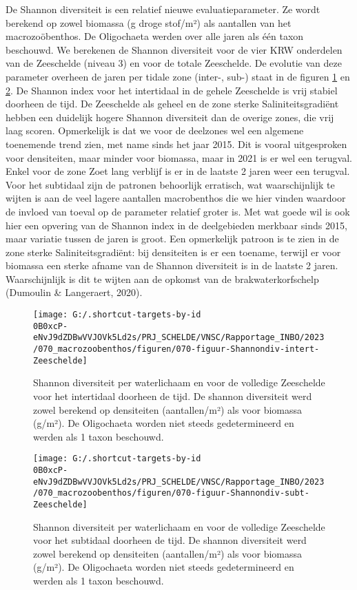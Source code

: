 \documentclass[twoside]{extreport}
\begin{document}
De Shannon diversiteit is een relatief nieuwe evaluatieparameter. Ze
wordt berekend op zowel biomassa (g droge stof/m²) als aantallen van het
macrozoöbenthos. De Oligochaeta werden over alle jaren als één taxon
beschouwd. We berekenen de Shannon diversiteit voor de vier KRW
onderdelen van de Zeeschelde (niveau 3) en voor de totale Zeeschelde. De
evolutie van deze parameter overheen de jaren per tidale zone (inter-,
sub-) staat in de figuren \ref{fig:070-figuur16} en
\ref{fig:070-figuur17}. De Shannon index voor het intertidaal in de
gehele Zeeschelde is vrij stabiel doorheen de tijd. De Zeeschelde als
geheel en de zone sterke Saliniteitsgradiënt hebben een duidelijk hogere
Shannon diversiteit dan de overige zones, die vrij laag scoren.
Opmerkelijk is dat we voor de deelzones wel een algemene toenemende
trend zien, met name sinds het jaar 2015. Dit is vooral uitgesproken
voor densiteiten, maar minder voor biomassa, maar in 2021 is er wel een
terugval. Enkel voor de zone Zoet lang verblijf is er in de laatste 2
jaren weer een terugval. Voor het subtidaal zijn de patronen behoorlijk
erratisch, wat waarschijnlijk te wijten is aan de veel lagere aantallen
macrobenthos die we hier vinden waardoor de invloed van toeval op de
parameter relatief groter is. Met wat goede wil is ook hier een opvering
van de Shannon index in de deelgebieden merkbaar sinds 2015, maar
variatie tussen de jaren is groot. Een opmerkelijk patroon is te zien in
de zone sterke Saliniteitsgradiënt: bij densiteiten is er een toename,
terwijl er voor biomassa een sterke afname van de Shannon diversiteit is
in de laatste 2 jaren. Waarschijnlijk is dit te wijten aan de opkomst
van de brakwaterkorfschelp (Dumoulin \& Langeraert, 2020).

\begin{figure}[H]

{\centering \texttt{[image: G:/.shortcut-targets-by-id\\0B0xcP-eNvJ9dZDBwVVJOVk5Ld2s/PRJ\_SCHELDE/VNSC/Rapportage\_INBO/2023/070\_macrozoobenthos/figuren/070-figuur-Shannondiv-intert-Zeeschelde]} 

}

\caption{Shannon diversiteit per waterlichaam en voor de volledige Zeeschelde voor het intertidaal doorheen de tijd. De shannon diversiteit werd zowel berekend op densiteiten (aantallen/m²) als voor biomassa (g/m²). De Oligochaeta worden niet steeds gedetermineerd en werden als 1 taxon beschouwd.}\label{fig:070-figuur16}
\end{figure}

\begin{figure}[H]

{\centering \texttt{[image: G:/.shortcut-targets-by-id\\0B0xcP-eNvJ9dZDBwVVJOVk5Ld2s/PRJ\_SCHELDE/VNSC/Rapportage\_INBO/2023/070\_macrozoobenthos/figuren/070-figuur-Shannondiv-subt-Zeeschelde]} 

}

\caption{Shannon diversiteit per waterlichaam en voor de volledige Zeeschelde voor het subtidaal doorheen de tijd. De shannon diversiteit werd zowel berekend op densiteiten (aantallen/m²) als voor biomassa (g/m²). De Oligochaeta worden niet steeds gedetermineerd en werden als 1 taxon beschouwd.}\label{fig:070-figuur17}
\end{figure}
\end{document}
